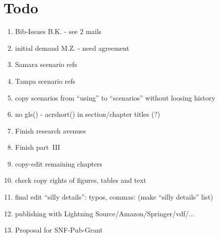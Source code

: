 \section*{Todo}

\begin{enumerate}\styleEnumerate

\item Bib-Issues B.K. - see 2 mails

\item initial demand M.Z. - need agreement

\item Samara scenario refs

\item Tampa scenario refs

\item copy scenarios from ``using'' to ``scenarios'' without loosing history

\item no gls() - acrshort() in section/chapter titles (?)

\item Finish research avenues

\item Finish part~III

\item copy-edit remaining chapters

\item check copy rights of figures, tables and text

\item final edit ``silly details'': typos, commas: (make ``silly details'' list)

\item publishing with Lightning Source/Amazon/Springer/vdf/...

\item Proposal for SNF-Pub-Grant







\end{enumerate}
